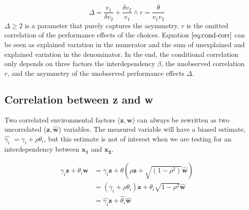 \documentclass[12pt]{article}
\begin{document}
\[
\Delta = \frac{v_1}{\delta v_2} + \frac{\delta v_2}{v_1}
\land r = \frac{\overline{\theta}}{v_1 v_2}
\] \(\Delta \geq 2\) is a parameter that purely captures the asymmetry.
\(r\) is the omitted correlation of the performance effects of the
choices. Equation \(\ref{eq:cond-corr}\) can be seen as explained
variation in the numerator and the sum of unexplained and explained
variation in the denominator. In the end, the conditional correlation
only depends on three factors the interdependency \(\beta\), the
unobserved correlation \(r\), and the asymmetry of the unobserved
performance effects \(\Delta\).

\subsection{Correlation between z and
w}\label{correlation-between-z-and-w}

Two correlated environmental factors (\(\mathbf{z}, \mathbf{w}\)) can
always be rewritten as two uncorrelated
(\(\mathbf{z}, \mathbf{\widehat{w}}\)) variables. The measured variable
will have a biased estimate, \(\widehat{\gamma_i}\)
\(= \gamma_i + \rho \theta_i\), but this estimate is not of interest
when we are testing for an interdependency between \(\mathbf{x_1}\) and
\(\mathbf{x_2}\).

\begin{align}
  \gamma_i \mathbf{z} + \theta_i \mathbf{w} &= \gamma_i \mathbf{z} +
  \theta (\rho \mathbf{z} + \sqrt{(1 - \rho^2)} \mathbf{\widehat{w}})
  \nonumber \\
  &= (\gamma_i + \rho \theta_i) \mathbf{z} + \theta_i \sqrt{1 - \rho^2}
  \mathbf{\widehat{w}} \nonumber \\
  &= \widehat{\gamma_i} \mathbf{z} + \widehat{\theta_i}
  \mathbf{\widehat{w}} \nonumber
\end{align}

\newpage



\end{document}
